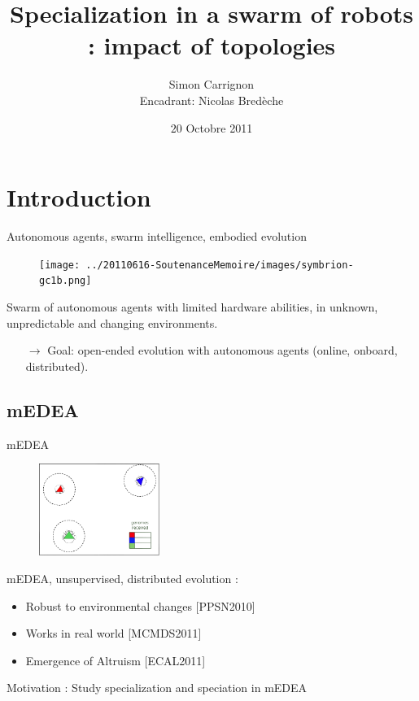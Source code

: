 \documentclass[8pt, handout=show,notes=show]{beamer}
\author[]{Simon Carrignon \\ 
\vfill Encadrant: Nicolas Bred\`{e}che }
\institute[]{
	École~Pratique~des~Hautes~Études, \and TAO/LRI\\
	\pgfdeclareimage[height=0.5cm]{ephe}{../20110616-SoutenanceMemoire/images/logo_ephe_large.jpg} %
	\pgfuseimage{ephe} \hfill \pgfdeclareimage[height=0.5cm]{inria}{../20110616-SoutenanceMemoire/images/taologo.jpg} %
	\pgfuseimage{inria}
	
}
\title{Specialization in a swarm of robots : impact of topologies}
\date{$20$ Octobre 2011}
\begin{document}
\begin{frame}
\maketitle

\end{frame}
	\newcommand{\imgSize}{4.2cm}

 \section{Introduction}
\begin{frame}{Autonomous agents, swarm intelligence, embodied evolution}
        \begin{figure}
		\texttt{[image: ../20110616-SoutenanceMemoire/images/symbrion-gc1b.png]}
        \end{figure}
	
	Swarm of autonomous agents with limited hardware abilities, in unknown, unpredictable and changing environments. 
	\begin{itemize}
		\item[$\rightarrow$] Goal: open-ended evolution with autonomous agents (online, onboard, distributed).
	\end{itemize}


\end{frame}
\subsection{mEDEA}

	
\begin{frame}{mEDEA }


\begin{figure}
\includegraphics[height=3cm]{images/medea0}
\end{figure}
mEDEA, unsupervised, distributed evolution :
	\begin{itemize}
		\item Robust to environmental changes [PPSN2010] \nocite{bredeche11mcmds} 
		\item Works in real world [MCMDS2011] %
		\item Emergence of Altruism [ECAL2011]
	\end{itemize}

\vfill

Motivation : Study specialization and speciation in mEDEA




\end{frame}
\end{document}
